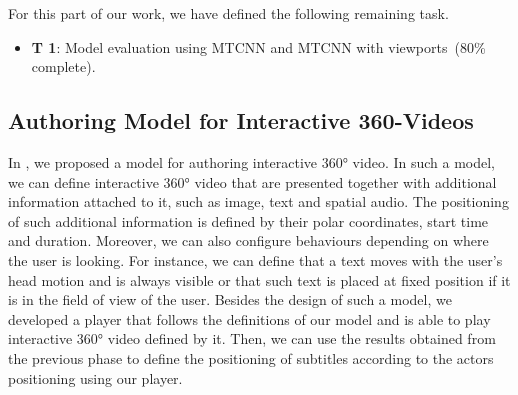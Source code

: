 For this part of our work, we have defined the following remaining task.

\begin{itemize}
    \item \textbf{T 1}: Model evaluation using MTCNN and MTCNN with viewports~(80\% complete).
\end{itemize}

\subsection{Authoring Model for Interactive 360-Videos}
\label{subsec:dynamic_subtitles}

In \cite{mendes2020authoring}, we proposed a model for authoring interactive 360° video. In such a model, we can define interactive 360° video that are presented together with additional information attached to it, such as image, text and spatial audio. The positioning of such additional information is defined by their polar coordinates, start time and duration. Moreover, we can also configure behaviours depending on where the user is looking. For instance, we can define that a text moves with the user's head motion and is always visible or that such text is placed at fixed position if it is in the field of view of the user. Besides the design of such a model, we developed a player that follows the definitions of our model and is able to play interactive 360° video defined by it. Then, we can use the results obtained from the previous phase to define the positioning of subtitles according to the actors positioning using our player.